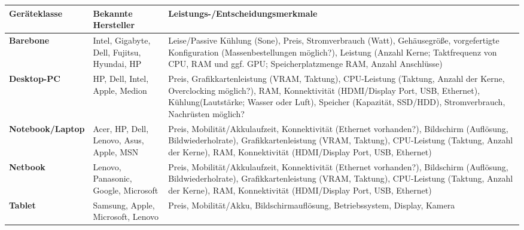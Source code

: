 \documentclass[asp1.tex]{subfiles}
\begin{document}
\begin{longtable}{|l|p{6cm}|p{6cm}|}
    \hline
    \textbf{Geräteklasse}    & \textbf{Bekannte Hersteller}                                     & \textbf{Leistungs-/Entscheidungsmerkmale}                                                                                                                                                                                                                                      \\\hline

    \textbf{Barebone}        & Intel, Gigabyte, Dell, Fujitsu, Hyundai, HP                      & Leise/Passive Kühlung (Sone), Preis, Stromverbrauch (Watt), Gehäusegröße, vorgefertigte Konfiguration (Massenbestellungen möglich?), Leistung (Anzahl Kerne; Taktfrequenz von CPU, RAM und ggf. GPU; Speicherplatzmenge RAM, Anzahl Anschlüsse)                                \\\hline

    \textbf{Desktop-PC}      & HP, Dell, Intel, Apple, Medion                                   & Preis, Grafikkartenleistung (VRAM, Taktung), CPU-Leistung (Taktung, Anzahl der Kerne, Overclocking möglich?), RAM, Konnektivität (HDMI/Display Port, USB, Ethernet), Kühlung(Lautstärke; Wasser oder Luft), Speicher (Kapazität, SSD/HDD), Stromverbrauch, Nachrüsten möglich? \\\hline

    \textbf{Notebook/Laptop} & Acer, HP, Dell, Lenovo, Asus, Apple, MSN                         & Preis, Mobilität/Akkulaufzeit, Konnektivität (Ethernet vorhanden?), Bildschirm (Auflösung, Bildwiederholrate), Grafikkartenleistung (VRAM, Taktung), CPU-Leistung (Taktung, Anzahl der Kerne), RAM, Konnektivität (HDMI/Display Port, USB, Ethernet)                           \\\hline

    \textbf{Netbook}         & Lenovo, Panasonic, Google, Microsoft                             & Preis, Mobilität/Akkulaufzeit, Konnektivität (Ethernet vorhanden?), Bildschirm (Auflösung, Bildwiederholrate), Grafikkartenleistung (VRAM, Taktung), CPU-Leistung (Taktung, Anzahl der Kerne), RAM, Konnektivität (HDMI/Display Port, USB, Ethernet)                           \\\hline

    \textbf{Tablet}          & Samsung, Apple, Microsoft, Lenovo                                & Preis, Mobilität/Akku, Bildschirmauflösung, Betriebssystem, Display, Kamera                                                                                                                                                                                                    \\\hline


\end{longtable}
\end{document}
